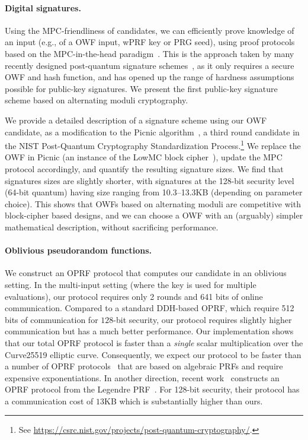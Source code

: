 \paragraph{Digital signatures.} Using the MPC-friendliness of candidates, we can efficiently prove knowledge of
an input (e.g., of a OWF input, wPRF key or PRG seed), using proof protocols
based on the MPC-in-the-head paradigm~\cite{ishai2007-zkmpc}.  This is the approach
taken by many recently designed post-quantum signature
schemes~\cite{chase2017-picnic,katz2018-pqsigs,beullens2020-sigma-mq,beullens2020-legroast,guilhem2019-bbq,banquet},
as it only requires a secure OWF and hash function, and has opened up the range
of hardness assumptions possible for public-key signatures.  We present the
first public-key signature scheme based on alternating moduli cryptography. 

We provide a detailed description of a signature scheme using our OWF candidate,
as a modification to the Picnic
algorithm~\cite{chase2017-picnic,katz2018-pqsigs,kales2020-picnic,picnic-spec}, a
third round candidate in the NIST Post-Quantum Cryptography Standardization
Process.\footnote{See
\url{https://csrc.nist.gov/projects/post-quantum-cryptography/}.} We replace
the OWF in Picnic (an instance of the LowMC block cipher~\cite{albrecht2015-lowmc}),
update the MPC protocol accordingly, and quantify the resulting signature
sizes.  We find that signatures sizes are slightly shorter, with signatures at
the 128-bit security level (64-bit quantum) having size ranging from 10.3--13.3KB (depending
on parameter choice).  This
shows that OWFs based on alternating moduli are competitive with block-cipher
based designs, and we can choose a OWF with an (arguably) simpler mathematical
description, without sacrificing performance. 

\paragraph{Oblivious pseudorandom functions.} 
We construct an OPRF protocol that computes our \ttwPRF candidate in an oblivious setting. In the multi-input setting (where the key is used for multiple evaluations), our protocol requires only 2 rounds and 641 bits of online communication.
Compared to a standard DDH-based OPRF, which require 512 bits of communication for $128$-bit security, our protocol requires slightly higher communication but has a much better performance. Our implementation shows that our total OPRF protocol is faster than a \textit{single} scalar multiplication over the Curve25519 elliptic curve. Consequently, we expect our protocol to be faster than a number of OPRF protocols~\cite{freedman2005-oprf,jarecki2009-oprf} that are based on algebraic PRFs and require expensive exponentiations. In another direction, recent work~\cite{seres2021-legendre} constructs an OPRF protocol from the Legendre PRF~\cite{damgard1988-legendre}. For 128-bit security, their protocol has a communication cost of $13$KB which is substantially higher than ours.



